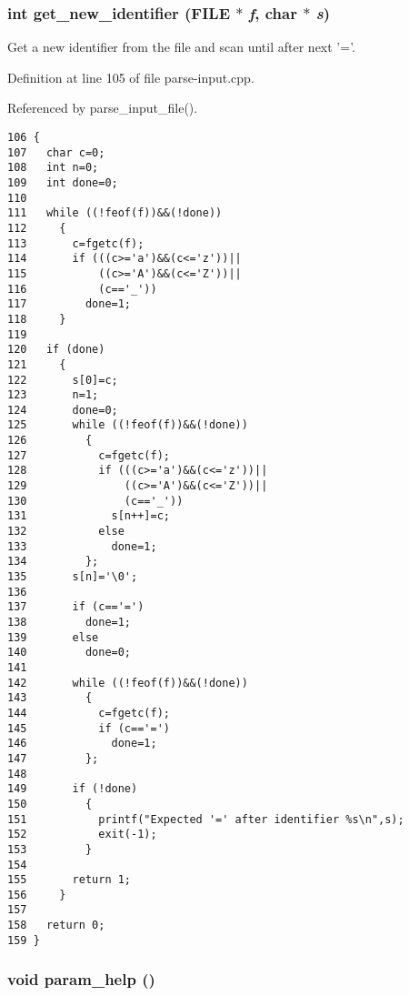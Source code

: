 \hypertarget{parse-input_8cpp_e28f089803e889dc1c1412f56f482ee7}{
\subsubsection[get\_\-new\_\-identifier]{\setlength{\rightskip}{0pt plus 5cm}int get\_\-new\_\-identifier (FILE $\ast$ {\em f}, char $\ast$ {\em s})}}
\label{parse-input_8cpp_e28f089803e889dc1c1412f56f482ee7}


Get a new identifier from the file and scan until after next '='. 



Definition at line 105 of file parse-input.cpp.

Referenced by parse\_\-input\_\-file().

\begin{Code}\begin{verbatim}106 {
107   char c=0;
108   int n=0;
109   int done=0;
110 
111   while ((!feof(f))&&(!done))
112     {
113       c=fgetc(f);
114       if (((c>='a')&&(c<='z'))||
115           ((c>='A')&&(c<='Z'))||
116           (c=='_'))
117         done=1;
118     }
119 
120   if (done)
121     {
122       s[0]=c;
123       n=1;
124       done=0;
125       while ((!feof(f))&&(!done)) 
126         {
127           c=fgetc(f);
128           if (((c>='a')&&(c<='z'))||
129               ((c>='A')&&(c<='Z'))||
130               (c=='_'))
131             s[n++]=c;
132           else 
133             done=1;
134         };
135       s[n]='\0';
136 
137       if (c=='=')
138         done=1;
139       else
140         done=0;
141 
142       while ((!feof(f))&&(!done))
143         {
144           c=fgetc(f);
145           if (c=='=')
146             done=1;
147         };
148       
149       if (!done)
150         {
151           printf("Expected '=' after identifier %s\n",s);
152           exit(-1);
153         }
154 
155       return 1;
156     }
157 
158   return 0;
159 }
\end{verbatim}\end{Code}


\hypertarget{parse-input_8cpp_e30f981622da23c664e95e813953673d}{
\subsubsection[param\_\-help]{\setlength{\rightskip}{0pt plus 5cm}void param\_\-help ()}}
\label{parse-input_8cpp_e30f981622da23c664e95e813953673d}


